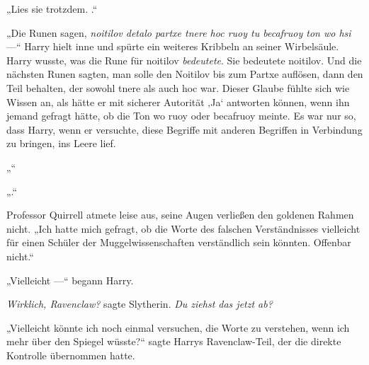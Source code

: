 „Lies sie trotzdem. .“

„Die Runen sagen, \emph{noitilov detalo partxe tnere hoc ruoy tu becafruoy ton wo hsi} —“ Harry hielt inne und spürte ein weiteres Kribbeln an seiner Wirbelsäule.
Harry wusste, was die Rune für noitilov \emph{bedeutete}. Sie bedeutete noitilov. Und die nächsten Runen sagten, man solle den Noitilov bis zum Partxe auflösen, dann den Teil behalten, der sowohl tnere als auch hoc war. Dieser Glaube fühlte sich wie Wissen an, als hätte er mit sicherer Autorität ‚Ja‘ antworten können, wenn ihn jemand gefragt hätte, ob die Ton wo ruoy oder becafruoy meinte. Es war nur so, dass Harry, wenn er versuchte, diese Begriffe mit anderen Begriffen in Verbindung zu bringen, ins Leere lief.

„“

„.“

Professor Quirrell atmete leise aus, seine Augen verließen den goldenen Rahmen nicht.
„Ich hatte mich gefragt, ob die Worte des falschen Verständnisses vielleicht für einen Schüler der Muggelwissenschaften verständlich sein könnten. Offenbar nicht.“

„Vielleicht —“ begann Harry.

\emph{Wirklich, Ravenclaw?} sagte Slytherin. \emph{Du ziehst das \emph{jetzt} ab?}

„Vielleicht könnte ich noch einmal versuchen, die Worte zu verstehen, wenn ich mehr über den Spiegel wüsste?“ sagte Harrys Ravenclaw-Teil, der die direkte Kontrolle übernommen hatte.

